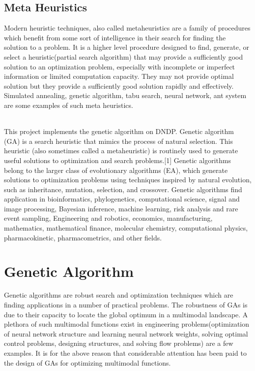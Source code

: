\documentclass[a4paper, 12pt]{article}
\begin{document}
\subsection{Meta Heuristics}
Modern heuristic techniques, also called metaheuristics are a family of procedures which benefit from some sort of intelligence in their search for finding the solution to a problem. It is a higher level procedure designed to find, generate, or select a heuristic(partial search algorithm) that may provide a sufficiently good solution to an optimization problem, especially with incomplete or imperfect information or limited computation capacity. They may not provide optimal solution but they provide a sufficiently good solution rapidly and effectively. Simulated annealing, genetic algorithm, tabu search, neural network, ant system are some examples of such meta heuristics.\par
\noindent
\\This project implements the genetic algorithm on DNDP. Genetic algorithm (GA) is a search heuristic that mimics the process of natural selection. This heuristic (also sometimes called a metaheuristic) is routinely used to generate useful solutions to optimization and search problems.[1] Genetic algorithms belong to the larger class of evolutionary algorithms (EA), which generate solutions to optimization problems using techniques inspired by natural evolution, such as inheritance, mutation, selection, and crossover. Genetic algorithms find application in bioinformatics, phylogenetics, computational science, signal and image processing, Bayesian inference, machine learning, risk analysis and rare event sampling, Engineering and robotics, economics, manufacturing, mathematics, mathematical finance, molecular chemistry, computational physics, pharmacokinetic, pharmacometrics, and other fields.\par
\newpage
\section{Genetic Algorithm}
Genetic algorithms are robust search and optimization techniques which are finding applications in a number of practical problems. The robustness of GAs is due to their capacity to locate the global optimum in a multimodal landscape. A plethora of such multimodal functions exist in engineering problems(optimization of neural network structure and learning neural network weights, solving optimal control problems, designing structures, and solving flow problems) are a few examples. It is for the above reason that considerable attention has been paid to the design of GAs for optimizing multimodal functions.\\ \par
\noindent
\end{document}
